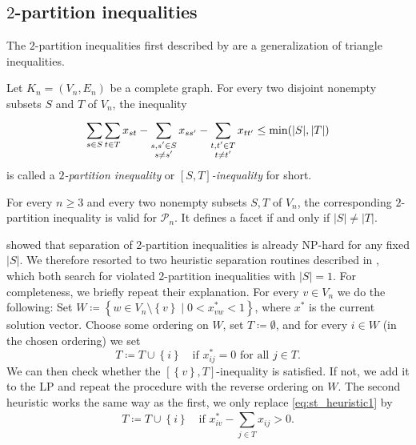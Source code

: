 \subsection{\texorpdfstring{$2$-partition}{2-partition} inequalities}\label{subsec:two_partition_separator}
The $2$-partition inequalities first described by \cite{grotschelFacetsCliquePartitioning1990} are a generalization of triangle inequalities.
\begin{definition}\label{def:2-partition_inequality}
	Let $K_{n} = (V_{n}, E_{n})$ be a complete graph.
	For every two disjoint nonempty subsets $S$ and $T$ of $V_{n}$, the inequality
	\begin{equation}\label{eq:2-partition_inequality}
		\sum_{s \in S}^{} \sum_{t \in T}^{} x_{st} - \sum_{\substack{s, s' \in S \\ s \neq s'}}^{} x_{ss'} - \sum_{\substack{t, t' \in T \\ t \neq t'}}^{} x_{tt'} \leq \operatorname{\text{min}}( \lvert S \rvert, \lvert T \rvert )
	\end{equation}
	is called a $2$\textit{-partition inequality} or \textit{$\left[ S,T \right]$-inequality} for short.
\end{definition}
\begin{theorem}
	For every $n \geq 3$ and every two nonempty subsets $S, T$ of $V_{n}$, the corresponding $2$-partition inequality is valid for $\mathscr{P}_{n}$.
	It defines a facet if and only if $\lvert  S \rvert \neq \lvert T \rvert$.
\end{theorem}
\cite{oostenCliquePartitioningProblem2001a} showed that separation of 2-partition inequalities is already \textsc{NP}-hard for any fixed $\lvert S \rvert$.
We therefore resorted to two heuristic separation routines described in \cite{grotschelFacetsCliquePartitioning1990}, which both search for violated 2-partition inequalities with $\lvert S \rvert = 1$.
For completeness, we briefly repeat their explanation.
For every $v \in V_{n}$ we do the following:
Set $W \coloneqq \left\{ w \in V_{n} \setminus \left\{ v \right\} \mid 0 < x_{vw}^{*} <1 \right\}$, where $x^{*}$ is the current solution vector.
Choose some ordering on $W$, set $T \coloneqq \emptyset$, and for every $i \in W$ (in the chosen ordering) we set
\begin{equation}\label{eq:st_heuristic1}
	T \coloneqq T \cup \left\{ i \right\} \quad \text{if } x^{*}_{ij}=0 \text{ for all } j \in T.
\end{equation}
We can then check whether the $\left[ \left\{ v \right\}, T \right]$-inequality is satisfied.
If not, we add it to the LP and repeat the procedure with the reverse ordering on $W$.
The second heuristic works the same way as the first, we only replace \cref{eq:st_heuristic1} by
\begin{equation}\label{eq:st_heuristic2}
	T \coloneqq T \cup \left\{ i \right\} \quad \text{if } x^{*}_{iv} - \sum_{j \in T}^{} x_{ij} > 0.
\end{equation}

